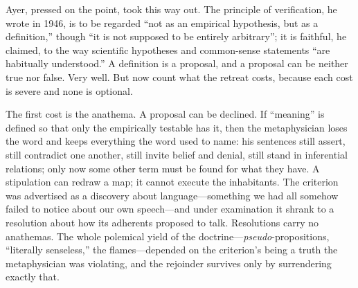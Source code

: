 Ayer, pressed on the point, took this way out. The principle of verification, he wrote in 1946, is to be regarded ``not as an empirical hypothesis, but as a definition,'' though ``it is not supposed to be entirely arbitrary''; it is faithful, he claimed, to the way scientific hypotheses and common-sense statements ``are habitually understood.'' A definition is a proposal, and a proposal can be neither true nor false. Very well. But now count what the retreat costs, because each cost is severe and none is optional.

The first cost is the anathema. A proposal can be declined. If ``meaning'' is defined so that only the empirically testable has it, then the metaphysician loses the word and keeps everything the word used to name: his sentences still assert, still contradict one another, still invite belief and denial, still stand in inferential relations; only now some other term must be found for what they have. A stipulation can redraw a map; it cannot execute the inhabitants. The criterion was advertised as a discovery about language---something we had all somehow failed to notice about our own speech---and under examination it shrank to a resolution about how its adherents proposed to talk. Resolutions carry no anathemas. The whole polemical yield of the doctrine---\emph{pseudo}-propositions, ``literally senseless,'' the flames---depended on the criterion's being a truth the metaphysician was violating, and the rejoinder survives only by surrendering exactly that.

